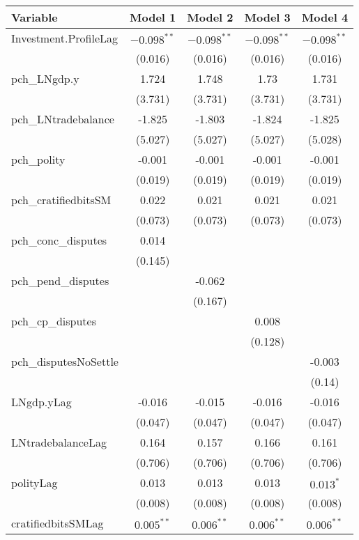 \begin{table}[ht]
\centering
\begin{tabular}{lcccc}
 Variable & Model 1 & Model 2 & Model 3 & Model 4 \\ 
  \hline
\hline
Investment.ProfileLag & $-0.098^{\ast\ast}$ & $-0.098^{\ast\ast}$ & $-0.098^{\ast\ast}$ & $-0.098^{\ast\ast}$ \\ 
   & (0.016) & (0.016) & (0.016) & (0.016) \\ 
   \hline
pch\_LNgdp.y & 1.724 & 1.748 & 1.73 & 1.731 \\ 
   & (3.731) & (3.731) & (3.731) & (3.731) \\ 
  pch\_LNtradebalance & -1.825 & -1.803 & -1.824 & -1.825 \\ 
   & (5.027) & (5.027) & (5.027) & (5.028) \\ 
  pch\_polity & -0.001 & -0.001 & -0.001 & -0.001 \\ 
   & (0.019) & (0.019) & (0.019) & (0.019) \\ 
  pch\_cratifiedbitsSM & 0.022 & 0.021 & 0.021 & 0.021 \\ 
   & (0.073) & (0.073) & (0.073) & (0.073) \\ 
  pch\_conc\_disputes & 0.014 &  &  &  \\ 
   & (0.145) &  &  &  \\ 
  pch\_pend\_disputes &  & -0.062 &  &  \\ 
   &  & (0.167) &  &  \\ 
  pch\_cp\_disputes &  &  & 0.008 &  \\ 
   &  &  & (0.128) &  \\ 
  pch\_disputesNoSettle &  &  &  & -0.003 \\ 
   &  &  &  & (0.14) \\ 
   \hline
LNgdp.yLag & -0.016 & -0.015 & -0.016 & -0.016 \\ 
   & (0.047) & (0.047) & (0.047) & (0.047) \\ 
  LNtradebalanceLag & 0.164 & 0.157 & 0.166 & 0.161 \\ 
   & (0.706) & (0.706) & (0.706) & (0.706) \\ 
  polityLag & 0.013 & 0.013 & 0.013 & $0.013^{\ast}$ \\ 
   & (0.008) & (0.008) & (0.008) & (0.008) \\ 
  cratifiedbitsSMLag & $0.005^{\ast\ast}$ & $0.006^{\ast\ast}$ & $0.006^{\ast\ast}$ & $0.006^{\ast\ast}$ \\ 

\end{tabular}
\end{table}
